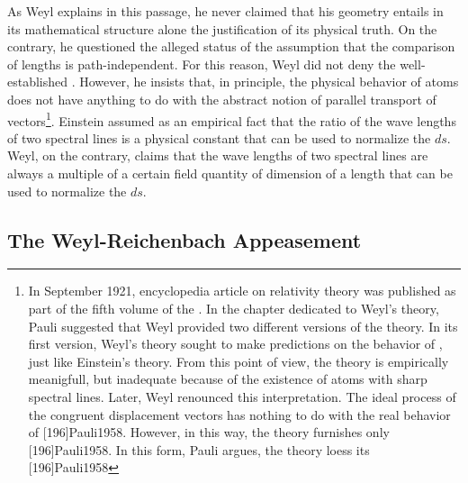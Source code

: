 \documentclass[draft]{article}
\newcommand{\WT}{Weyl's theory\xspace}
\begin{document}
As Weyl explains in this passage, he never claimed that his geometry entails in its mathematical structure alone the \apr justification of its physical truth. On the contrary, he questioned the alleged \apr status of the assumption that the comparison of lengths is path-independent. For this reason, Weyl did not deny the well-established . However, he insists that, in principle, the physical behavior of atoms does not have anything to do with the abstract notion of parallel transport of vectors\footnote{\label{pauli}In September 1921,  encyclopedia article on relativity theory was published as part of the fifth volume of the . In the chapter dedicated to \WT, Pauli suggested that Weyl provided two different versions of the theory. In its first version, \WT sought to make predictions on the behavior of \rac, just like Einstein's theory. From this point of view, the theory is empirically meanigfull, but inadequate because of the existence of atoms with sharp spectral lines. Later, Weyl renounced this interpretation. The ideal process of the congruent displacement vectors has nothing to do with the real behavior of \rac {}[196]{Pauli1958}. However, in this way, the theory furnishes only  [196]{Pauli1958}. In this form, Pauli argues, the theory loess its  [196]{Pauli1958}}. Einstein assumed as an empirical fact that the ratio of the wave lengths of two spectral lines is a  physical constant that can be used to normalize the $ds$. Weyl, on the contrary, claims that the wave lengths of two spectral lines are always a multiple of a certain field quantity of dimension of a length that can be used to normalize the $ds$. 

\subsection{The Weyl-Reichenbach Appeasement}

  
\end{document}
